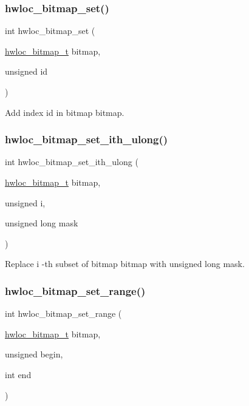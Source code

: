 \subsubsection{\texorpdfstring{hwloc\+\_\+bitmap\+\_\+set()}{hwloc\_bitmap\_set()}}
{\footnotesize\ttfamily int hwloc\+\_\+bitmap\+\_\+set (\begin{DoxyParamCaption}\item[{\hyperlink{a00205_gaa3c2bf4c776d603dcebbb61b0c923d84}{hwloc\+\_\+bitmap\+\_\+t}}]{bitmap,  }\item[{unsigned}]{id }\end{DoxyParamCaption})}



Add index {\ttfamily id} in bitmap {\ttfamily bitmap}. 

\mbox{\label{a00205_ga3daeed965c35c6d2fd4820a318219985}} 
\subsubsection{\texorpdfstring{hwloc\+\_\+bitmap\+\_\+set\+\_\+ith\+\_\+ulong()}{hwloc\_bitmap\_set\_ith\_ulong()}}
{\footnotesize\ttfamily int hwloc\+\_\+bitmap\+\_\+set\+\_\+ith\+\_\+ulong (\begin{DoxyParamCaption}\item[{\hyperlink{a00205_gaa3c2bf4c776d603dcebbb61b0c923d84}{hwloc\+\_\+bitmap\+\_\+t}}]{bitmap,  }\item[{unsigned}]{i,  }\item[{unsigned long}]{mask }\end{DoxyParamCaption})}



Replace {\ttfamily i} -\/th subset of bitmap {\ttfamily bitmap} with unsigned long {\ttfamily mask}. 

\mbox{\label{a00205_ga9c9a8433732fb9f24899e7aa4c014d7e}} 
\subsubsection{\texorpdfstring{hwloc\+\_\+bitmap\+\_\+set\+\_\+range()}{hwloc\_bitmap\_set\_range()}}
{\footnotesize\ttfamily int hwloc\+\_\+bitmap\+\_\+set\+\_\+range (\begin{DoxyParamCaption}\item[{\hyperlink{a00205_gaa3c2bf4c776d603dcebbb61b0c923d84}{hwloc\+\_\+bitmap\+\_\+t}}]{bitmap,  }\item[{unsigned}]{begin,  }\item[{int}]{end }\end{DoxyParamCaption})}



